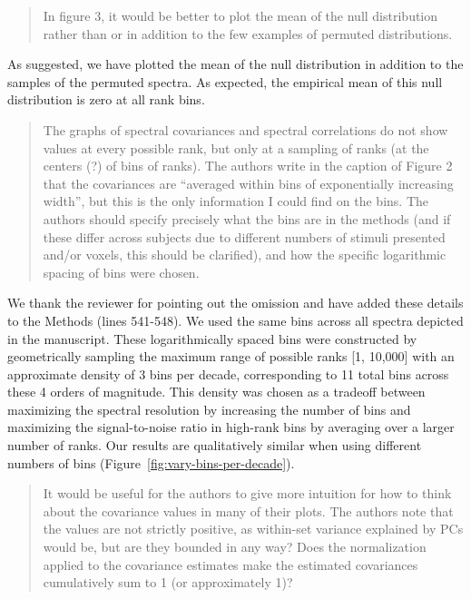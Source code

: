 \documentclass[10pt]{article}
\begin{document}
\begin{quote}
In figure 3, it would be better to plot the mean of the null distribution rather than or in addition to the few examples of permuted distributions.
\end{quote}

As suggested, we have plotted the mean of the null distribution in addition to the samples of the permuted spectra. As expected, the empirical mean of this null distribution is zero at all rank bins.

\begin{quote}
The graphs of spectral covariances and spectral correlations do not show values at every possible rank, but only at a sampling of ranks (at the centers (?) of bins of ranks). The authors write in the caption of Figure 2 that the covariances are ``averaged within bins of exponentially increasing width'', but this is the only information I could find on the bins. The authors should specify precisely what the bins are in the methods (and if these differ across subjects due to different numbers of stimuli presented and/or voxels, this should be clarified), and how the specific logarithmic spacing of bins were chosen.
\end{quote}

We thank the reviewer for pointing out the omission and have added these details to the Methods (lines 541-548). We used the same bins across all spectra depicted in the manuscript. These logarithmically spaced bins were constructed by geometrically sampling the maximum range of possible ranks {[}1, 10,000{]} with an approximate density of 3 bins per decade, corresponding to 11 total bins across these 4 orders of magnitude. This density was chosen as a tradeoff between maximizing the spectral resolution by increasing the number of bins and maximizing the signal-to-noise ratio in high-rank bins by averaging over a larger number of ranks. Our results are qualitatively similar when using different numbers of bins (Figure~\ref{fig:vary-bins-per-decade}).

\begin{quote}
It would be useful for the authors to give more intuition for how to think about the covariance values in many of their plots. The authors note that the values are not strictly positive, as within-set variance explained by PCs would be, but are they bounded in any way? Does the normalization applied to the covariance estimates make the estimated covariances cumulatively sum to 1 (or approximately 1)?
\end{quote}
\end{document}
